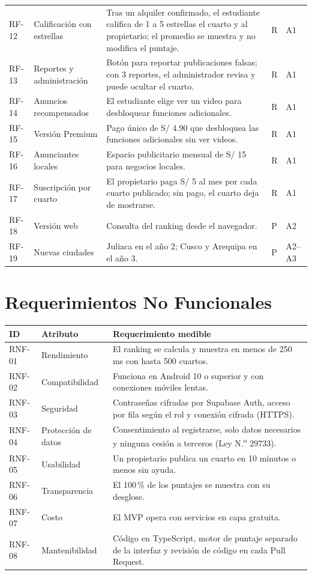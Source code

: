 \documentclass[11pt,a4paper]{article}
\begin{document}
{\begin{tabularx}{\textwidth}{@{}P{1.3cm} P{3.2cm} L C{0.6cm} C{0.9cm}@{}}
RF-12 & Calificación con estrellas & Tras un alquiler confirmado, el estudiante califica de 1 a 5 estrellas el cuarto y al propietario; el promedio se muestra y no modifica el puntaje. & R & A1 \\
RF-13 & Reportes y administración & Botón para reportar publicaciones falsas; con 3 reportes, el administrador revisa y puede ocultar el cuarto. & R & A1 \\
RF-14 & Anuncios recompensados & El estudiante elige ver un video para desbloquear funciones adicionales. & R & A1 \\
RF-15 & Versión Premium & Pago único de S/ 4.90 que desbloquea las funciones adicionales sin ver videos. & R & A1 \\
RF-16 & Anunciantes locales & Espacio publicitario mensual de S/ 15 para negocios locales. & R & A1 \\
RF-17 & Suscripción por cuarto & El propietario paga S/ 5 al mes por cada cuarto publicado; sin pago, el cuarto deja de mostrarse. & R & A1 \\
RF-18 & Versión web & Consulta del ranking desde el navegador. & P & A2 \\
RF-19 & Nuevas ciudades & Juliaca en el año 2; Cusco y Arequipa en el año 3. & P & A2--A3 \\
\bottomrule
\end{tabularx}
}

\section{Requerimientos No Funcionales}
{\small
\noindent\begin{tabularx}{\textwidth}{@{}P{1.6cm} P{2.8cm} L@{}}
\toprule
{}
\textbf{ID} & \textbf{Atributo} & \textbf{Requerimiento medible} \\
\midrule
RNF-01 & Rendimiento & El ranking se calcula y muestra en menos de 250 ms con hasta 500 cuartos. \\
RNF-02 & Compatibilidad & Funciona en Android 10 o superior y con conexiones móviles lentas. \\
RNF-03 & Seguridad & Contraseñas cifradas por Supabase Auth, acceso por fila según el rol y conexión cifrada (HTTPS). \\
RNF-04 & Protección de datos & Consentimiento al registrarse, solo datos necesarios y ninguna cesión a terceros (Ley N.\textsuperscript{o} 29733). \\
RNF-05 & Usabilidad & Un propietario publica un cuarto en 10 minutos o menos sin ayuda. \\
RNF-06 & Transparencia & El 100\,\% de los puntajes se muestra con su desglose. \\
RNF-07 & Costo & El MVP opera con servicios en capa gratuita. \\
RNF-08 & Mantenibilidad & Código en TypeScript, motor de puntaje separado de la interfaz y revisión de código en cada Pull Request. \\
\bottomrule
\end{tabularx}
}
\end{document}
